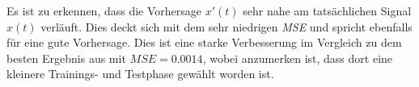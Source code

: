 Es ist zu erkennen, dass die Vorhersage $x'(t)$ sehr nahe am tatsächlichen Signal $x(t)$ verläuft. Dies deckt sich mit dem sehr niedrigen \textit{MSE} und spricht ebenfalls für eine gute Vorhersage. Dies ist eine starke Verbesserung im Vergleich zu dem besten Ergebnis aus \citep{caraballo2014} mit $MSE = 0.0014$, wobei anzumerken ist, dass dort eine kleinere Trainings- und Testphase gewählt worden ist.